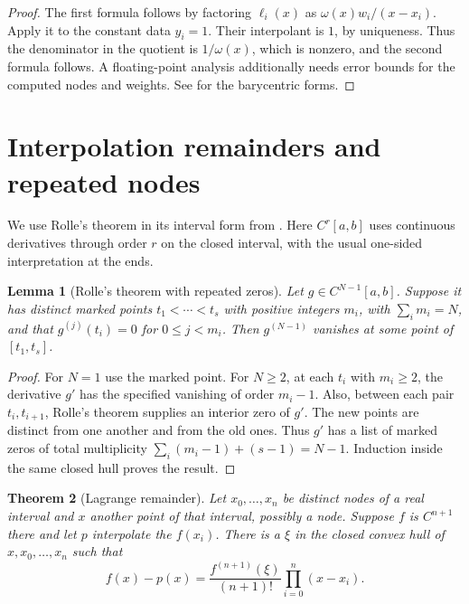 \documentclass[11pt,oneside,openany]{book}
\theoremstyle{plain}
\newtheorem{theorem}{Theorem}[chapter]
\newtheorem{lemma}[theorem]{Lemma}
\theoremstyle{definition}
\theoremstyle{remark}
\begin{document}
\begin{proof}
The first formula follows by factoring \(\ell_i(x)\) as
\(\omega(x)w_i/(x-x_i)\). Apply it to the constant data \(y_i=1\).
Their interpolant is \(1\), by uniqueness. Thus the denominator
in the quotient is \(1/\omega(x)\), which is nonzero, and the
second formula follows. A floating-point analysis additionally
needs error bounds for the computed nodes and weights.
See \cite[Section 2]{berrut} for the barycentric forms.
\end{proof}

\section{Interpolation remainders and repeated nodes}

We use Rolle's theorem in its interval form from
\cite[\texttt{K03.05.rolle}]{d03}. Here \(C^r[a,b]\) uses continuous
derivatives through order \(r\) on the closed interval, with the
usual one-sided interpretation at the ends.

\begin{lemma}[Rolle's theorem with repeated zeros]\label{p206:repeated-rolle}
Let \(g\in C^{N-1}[a,b]\). Suppose it has distinct marked points
\(t_1<\cdots<t_s\) with positive integers \(m_i\), with
\(\sum_i m_i=N\), and that \(g^{(j)}(t_i)=0\) for \(0\le j<m_i\).
Then \(g^{(N-1)}\) vanishes at some point of \([t_1,t_s]\).
\end{lemma}

\begin{proof}
For \(N=1\) use the marked point. For \(N\ge2\), at each \(t_i\)
with \(m_i\ge2\), the derivative \(g'\) has the specified vanishing
of order \(m_i-1\). Also, between each pair \(t_i,t_{i+1}\), Rolle's
theorem supplies an interior zero of \(g'\). The new points
are distinct from one another and from the old ones.
Thus \(g'\) has a list of marked zeros of total multiplicity
\(\sum_i(m_i-1)+(s-1)=N-1\). Induction inside the same
closed hull proves the result.
\end{proof}

\begin{theorem}[Lagrange remainder]\label{p206:W50}
Let \(x_0,\ldots,x_n\) be distinct nodes of a real interval and \(x\)
another point of that interval, possibly a node. Suppose \(f\) is
\(C^{n+1}\) there and let \(p\) interpolate the \(f(x_i)\).
There is a \(\xi\) in the closed convex hull of \(x,x_0,\ldots,x_n\)
such that
\[
 f(x)-p(x)=\frac{f^{(n+1)}(\xi)}{(n+1)!}
                   \prod_{i=0}^n(x-x_i).
\]
\end{theorem}
\end{document}
